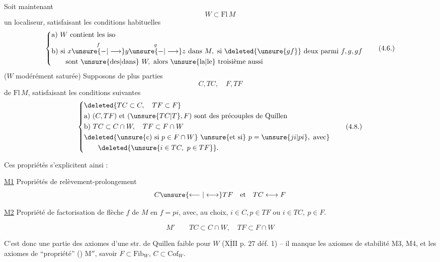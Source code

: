 Soit maintenant
\[
W\subset\mathrm{Fl}\,M
\tag*{(4.5.)}
\]
un localiseur, satisfaisant les conditions habituelles
\[
\left\{\begin{aligned}
&\text{a) }W\text{ contient les iso}\\
&\text{b) si }x\overset f{\unsure{-|\longrightarrow}}y\overset g{\unsure{-|\longrightarrow}}z\text{ dans }M,\text{ si }\deleted{\unsure{gf}}\text{ deux parmi }f,g,gf\\
&\qquad\text{sont \unsure{des|dans} }W,\text{ alors \unsure{la|le} troisième aussi}
\end{aligned}\right.
\tag*{(4.6.)}
\]
($W$ modérément saturée)  Supposons
de plus    parties
\[
C,TC,\quad F,TF
\tag*{(4.7)}
\]
de $\mathrm{Fl}\,M$, satisfaisant les conditions suivantes
\[
\left\{\begin{aligned}
&\deleted{TC\subset C,\quad TF\subset F}\\
&\text{a) }(C,TF)\text{ et }(\unsure{TC|T},F)\text{ sont des précouples de Quillen}\\
&\text{b) }TC\subset C\cap W,\quad TF\subset F\cap W\\
&\deleted{\unsure{\text{c) si }p\in F\cap W}\text{ \unsure{et si} }p=\unsure{ji|pi},\text{ avec}}\\
&\qquad\deleted{\unsure{i\in TC,\ p\in TF}}.
\end{aligned}\right.
\tag*{(4.8.)}
\]

Ces propriétés s'explicitent ainsi :

\uline{M1} Propriétés de relèvement-prolongement
\[
C\unsure{\longleftarrow|\longleftrightarrow}TF\quad\text{et}\quad TC\longleftrightarrow F
\]

\uline{M2} Propriété de factorisation de  flèche
$f$ de $M$ en $f=pi$, avec, au choix, $i\in C,p\in TF$
ou $i\in TC,\ p\in F$.

\[
M'\qquad TC\subset C\cap W,\quad TF\subset F\cap W
\]

C'est donc une partie des axiomes d'une
str. de Quillen faible  pour $W$
($\overline{\underline{\mathrm{XIII}}}$ p. 27 déf. 1) -- il manque les axiomes
de stabilité M3, M4, et les axiomes de
``propriété'' () M$''$, savoir $F\subset\mathrm{Fib}_W$, $C\subset\mathrm{Cof}_W$.

